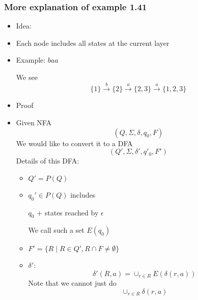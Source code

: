 \begin{frame}[allowframebreaks] \frametitle{More explanation
    of example 1.41}
\begin{itemize}

\item Idea: 

  
\item [] Each node includes all states at the current layer
  
\item Example: $baa$


  \begin{center}
\end{center}
We see
\begin{equation*}
  \{1\} \xrightarrow{b} \{2\} \xrightarrow{a} \{2, 3\}
  \xrightarrow{a} \{1, 2, 3\}
\end{equation*}
\item Proof
  \item[] Given NFA
    \begin{equation*}
(Q,\Sigma, \delta, q_0, F)
\end{equation*}
We would like to convert it to a DFA
\begin{equation*}
(Q', \Sigma, \delta', q'_0, F')
\end{equation*}
Details of this DFA:
\begin{itemize}
\item $Q'=P(Q)$
\item $q_0' \in P(Q)$ includes
  \begin{center}
 $q_0$ + states
reached by $\epsilon$
\end{center}
We call such a set $E(q_0)$
\item $F'=
\{R\mid R \in Q', R \cap F\neq \emptyset\}$
\item $\delta'$:
  \begin{equation*}
    \delta'(R,a)=
\cup_{r\in R} E(\delta(r,a))
\end{equation*}
Note that we cannot just do
\begin{equation*}
\cup_{r\in R}\delta(r,a)
\end{equation*}
\end{itemize}
\end{itemize}
\end{frame}


